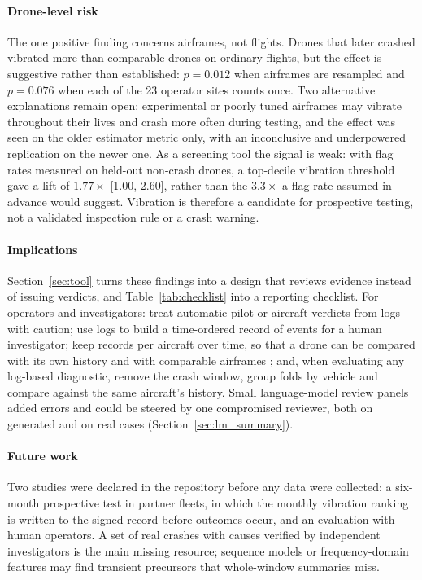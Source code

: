 \documentclass[preprint,12pt]{elsarticle}
\begin{document}
\paragraph{Drone-level risk} The one positive finding concerns airframes, not flights. Drones that later crashed vibrated more than comparable drones on ordinary flights, but the effect is suggestive rather than established: $p=0.012$ when airframes are resampled and $p=0.076$ when each of the 23 operator sites counts once. Two alternative explanations remain open: experimental or poorly tuned airframes may vibrate throughout their lives and crash more often during testing, and the effect was seen on the older estimator metric only, with an inconclusive and underpowered replication on the newer one. As a screening tool the signal is weak: with flag rates measured on held-out non-crash drones, a top-decile vibration threshold gave a lift of $1.77\times$ [1.00, 2.60], rather than the $3.3\times$ a flag rate assumed in advance would suggest. Vibration is therefore a candidate for prospective testing, not a validated inspection rule or a crash warning.

\paragraph{Implications} Section~\ref{sec:tool} turns these findings into a design that reviews evidence instead of issuing verdicts, and Table~\ref{tab:checklist} into a reporting checklist. For operators and investigators: treat automatic pilot-or-aircraft verdicts from logs with caution; use logs to build a time-ordered record of events for a human investigator; keep records per aircraft over time, so that a drone can be compared with its own history and with comparable airframes \cite{eu2019947,easa2024ear}; and, when evaluating any log-based diagnostic, remove the crash window, group folds by vehicle and compare against the same aircraft's history. Small language-model review panels added errors and could be steered by one compromised reviewer, both on generated and on real cases (Section~\ref{sec:lm_summary}).

\paragraph{Future work} Two studies were declared in the repository before any data were collected: a six-month prospective test in partner fleets, in which the monthly vibration ranking is written to the signed record before outcomes occur, and an evaluation with human operators. A set of real crashes with causes verified by independent investigators is the main missing resource; sequence models or frequency-domain features may find transient precursors that whole-window summaries miss.
\end{document}
